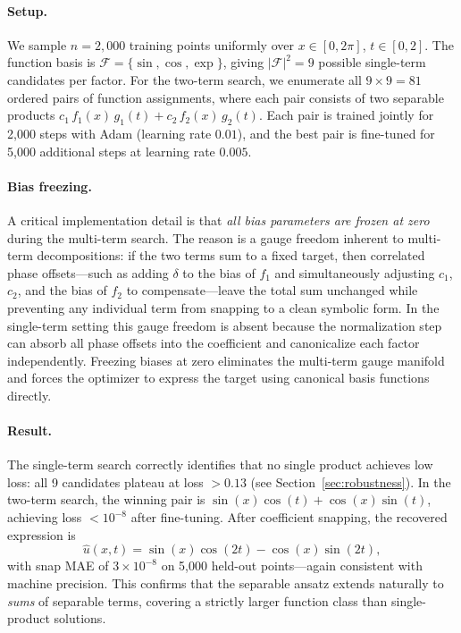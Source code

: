 \paragraph{Setup.}
We sample $n=2{,}000$ training points uniformly over $x\in[0,2\pi]$,
$t\in[0,2]$.  The function basis is $\mathcal{F}=\{\sin,\cos,\exp\}$, giving
$|\mathcal{F}|^2=9$ possible single-term candidates per factor.  For
the two-term search, we enumerate all $9\times 9 = 81$ ordered pairs of
function assignments, where each pair consists of two separable products
$c_1\,f_1(x)\,g_1(t) + c_2\,f_2(x)\,g_2(t)$.  Each pair is trained jointly
for 2{,}000 steps with Adam (learning rate $0.01$), and the best pair is
fine-tuned for 5{,}000 additional steps at learning rate $0.005$.

\paragraph{Bias freezing.}
A critical implementation detail is that \emph{all bias parameters are frozen
at zero} during the multi-term search.  The reason is a gauge freedom inherent
to multi-term decompositions: if the two terms sum to a fixed target, then
correlated phase offsets---such as adding $\delta$ to the bias of $f_1$ and
simultaneously adjusting $c_1$, $c_2$, and the bias of $f_2$ to
compensate---leave the total sum unchanged while preventing any individual
term from snapping to a clean symbolic form.  In the single-term setting this
gauge freedom is absent because the normalization step can absorb all phase
offsets into the coefficient and canonicalize each factor independently.
Freezing biases at zero eliminates the multi-term gauge manifold and forces
the optimizer to express the target using canonical basis functions directly.

\paragraph{Result.}
The single-term search correctly identifies that no single product achieves low
loss: all 9 candidates plateau at loss $> 0.13$ (see
Section~\ref{sec:robustness}).  In the two-term search, the winning pair is
$\sin(x)\cos(t) + \cos(x)\sin(t)$, achieving loss $< 10^{-8}$ after
fine-tuning.  After coefficient snapping, the recovered expression is
\begin{equation}
  \hat{u}(x,t) = \sin(x)\cos(2t) - \cos(x)\sin(2t),
  \label{eq:traveling_recovered}
\end{equation}
with snap MAE of $3\times 10^{-8}$ on 5{,}000 held-out points---again
consistent with machine precision.  This confirms that the separable ansatz
extends naturally to \emph{sums} of separable terms, covering a strictly larger
function class than single-product solutions.

